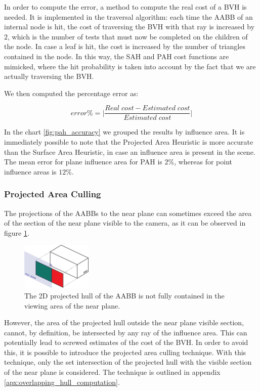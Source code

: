 \documentclass[acmtog, anonymous, review]{acmart}
\begin{document}
In order to compute the error, a method to compute the real cost of a BVH is needed. It is implemented in the traversal algorithm: each time the AABB of an internal node is hit, the cost of traversing the BVH with that ray is increased by $2$, which is the number of tests that must now be completed on the children of the node. In case a leaf is hit, the cost is increased by the number of triangles contained in the node. In this way, the SAH and PAH cost functions are mimicked, where the hit probability is taken into account by the fact that we are actually traversing the BVH.

We then computed the percentage error as:

$$
error\% = \Bigg|\frac{Real\;cost - Estimated\;cost}{Estimated\;cost}\Bigg|
$$

In the chart \ref{fig:pah_accuracy} we grouped the results by influence area. It is immediately possible to note that the Projected Area Heuristic is more accurate than the Surface Area Heuristic, in case an influence area is present in the scene. The mean error for plane influence area for PAH is $2\%$, whereas for point influence areas is $12\%$.

\subsubsection{Projected Area Culling} \label{ssec:proj_area_culling}
The projections of the AABBs to the near plane can sometimes exceed the area of the section of the near plane visible to the camera, as it can be observed in figure \ref{fig:near_plane_culling}.

\begin{figure}[H]
  \centering
  \includegraphics[width=0.3\textwidth]{Images/near_plane_culling.png}
  \caption{The 2D projected hull of the AABB is not fully contained in the viewing area of the near plane.}
  \label{fig:near_plane_culling} 
\end{figure}

However, the area of the projected hull outside the near plane visible section, cannot, by definition, be intersected by any ray of the influence area. This can potentially lead to screwed estimates of the cost of the BVH. In order to avoid this, it is possible to introduce the projected area culling technique. With this technique, only the set intersection of the projected hull with the visible section of the near plane is considered. The technique is outlined in appendix \ref{apx:overlapping_hull_computation}.
\end{document}
